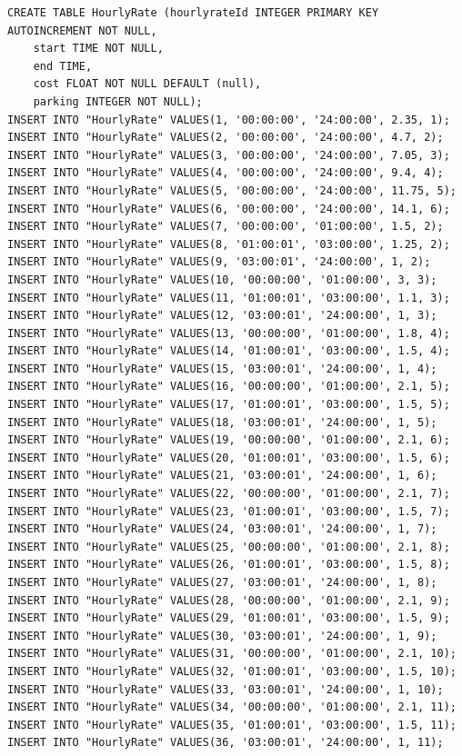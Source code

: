 \documentclass[a4paper,11pt]{article}
\begin{document}
\begin{lstlisting}
CREATE TABLE HourlyRate (hourlyrateId INTEGER PRIMARY KEY AUTOINCREMENT NOT NULL,
	start TIME NOT NULL,
	end TIME,
	cost FLOAT NOT NULL DEFAULT (null),
	parking INTEGER NOT NULL);
INSERT INTO "HourlyRate" VALUES(1, '00:00:00', '24:00:00', 2.35, 1);
INSERT INTO "HourlyRate" VALUES(2, '00:00:00', '24:00:00', 4.7, 2);
INSERT INTO "HourlyRate" VALUES(3, '00:00:00', '24:00:00', 7.05, 3);
INSERT INTO "HourlyRate" VALUES(4, '00:00:00', '24:00:00', 9.4, 4);
INSERT INTO "HourlyRate" VALUES(5, '00:00:00', '24:00:00', 11.75, 5);
INSERT INTO "HourlyRate" VALUES(6, '00:00:00', '24:00:00', 14.1, 6);
INSERT INTO "HourlyRate" VALUES(7, '00:00:00', '01:00:00', 1.5, 2);
INSERT INTO "HourlyRate" VALUES(8, '01:00:01', '03:00:00', 1.25, 2);
INSERT INTO "HourlyRate" VALUES(9, '03:00:01', '24:00:00', 1, 2);
INSERT INTO "HourlyRate" VALUES(10, '00:00:00', '01:00:00', 3, 3);
INSERT INTO "HourlyRate" VALUES(11, '01:00:01', '03:00:00', 1.1, 3);
INSERT INTO "HourlyRate" VALUES(12, '03:00:01', '24:00:00', 1, 3);
INSERT INTO "HourlyRate" VALUES(13, '00:00:00', '01:00:00', 1.8, 4);
INSERT INTO "HourlyRate" VALUES(14, '01:00:01', '03:00:00', 1.5, 4);
INSERT INTO "HourlyRate" VALUES(15, '03:00:01', '24:00:00', 1, 4);
INSERT INTO "HourlyRate" VALUES(16, '00:00:00', '01:00:00', 2.1, 5);
INSERT INTO "HourlyRate" VALUES(17, '01:00:01', '03:00:00', 1.5, 5);
INSERT INTO "HourlyRate" VALUES(18, '03:00:01', '24:00:00', 1, 5);
INSERT INTO "HourlyRate" VALUES(19, '00:00:00', '01:00:00', 2.1, 6);
INSERT INTO "HourlyRate" VALUES(20, '01:00:01', '03:00:00', 1.5, 6);
INSERT INTO "HourlyRate" VALUES(21, '03:00:01', '24:00:00', 1, 6);
INSERT INTO "HourlyRate" VALUES(22, '00:00:00', '01:00:00', 2.1, 7);
INSERT INTO "HourlyRate" VALUES(23, '01:00:01', '03:00:00', 1.5, 7);
INSERT INTO "HourlyRate" VALUES(24, '03:00:01', '24:00:00', 1, 7);
INSERT INTO "HourlyRate" VALUES(25, '00:00:00', '01:00:00', 2.1, 8);
INSERT INTO "HourlyRate" VALUES(26, '01:00:01', '03:00:00', 1.5, 8);
INSERT INTO "HourlyRate" VALUES(27, '03:00:01', '24:00:00', 1, 8);
INSERT INTO "HourlyRate" VALUES(28, '00:00:00', '01:00:00', 2.1, 9);
INSERT INTO "HourlyRate" VALUES(29, '01:00:01', '03:00:00', 1.5, 9);
INSERT INTO "HourlyRate" VALUES(30, '03:00:01', '24:00:00', 1, 9);
INSERT INTO "HourlyRate" VALUES(31, '00:00:00', '01:00:00', 2.1, 10);
INSERT INTO "HourlyRate" VALUES(32, '01:00:01', '03:00:00', 1.5, 10);
INSERT INTO "HourlyRate" VALUES(33, '03:00:01', '24:00:00', 1, 10);
INSERT INTO "HourlyRate" VALUES(34, '00:00:00', '01:00:00', 2.1, 11);
INSERT INTO "HourlyRate" VALUES(35, '01:00:01', '03:00:00', 1.5, 11);
INSERT INTO "HourlyRate" VALUES(36, '03:00:01', '24:00:00', 1, 11);

\end{lstlisting}
\end{document}

